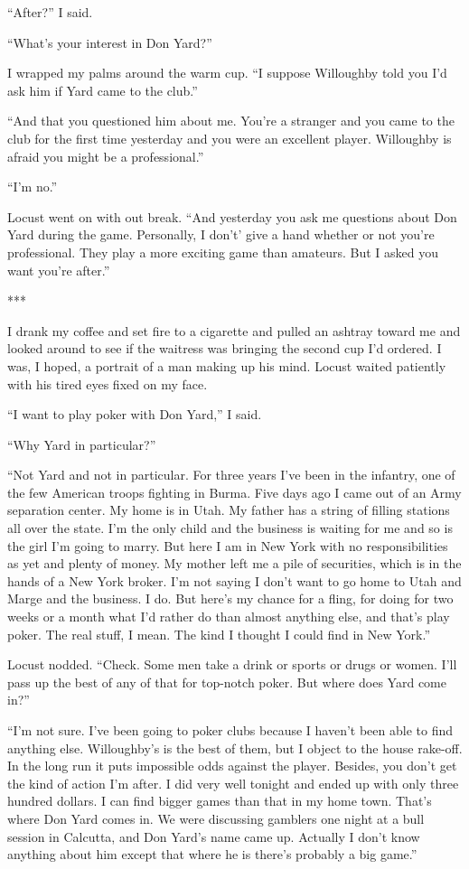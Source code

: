 \documentclass{novel}
\begin{document}
“After?” I said.

“What’s your interest in Don Yard?”

I wrapped my palms around the warm cup. “I suppose Willoughby told you I’d ask him if Yard came to the club.”

“And that you questioned him about me. You’re a stranger and you came to the club for the first time yesterday and you were an excellent player. Willoughby is afraid you might be a professional.”

“I’m no.”

Locust went on with out break. “And yesterday you ask me questions about Don Yard during the game. Personally, I don’t’ give a hand whether or not you’re professional. They play a more exciting game than amateurs. But I asked you want you’re after.”

***

I drank my coffee and set fire to a cigarette and pulled an ashtray toward me and looked around to see if the waitress was bringing the second cup I’d ordered. I was, I hoped, a portrait of a man making up his mind. Locust waited patiently with his tired eyes fixed on my face.

“I want to play poker with Don Yard,” I said.

“Why Yard in particular?”

“Not Yard and not in particular. For three years I’ve been in the infantry, one of the few American troops fighting in Burma. Five days ago I came out of an Army separation center. My home is in Utah. My father has a string of filling stations all over the state. I’m the only child and the business is waiting for me and so is the girl I’m going to marry. But here I am in New York with no responsibilities as yet and plenty of money. My mother left me a pile of securities, which is in the hands of a New York broker. I’m not saying I don’t want to go home to Utah and Marge and the business. I do. But here’s my chance for a fling, for doing for two weeks or a month what I’d rather do than almost anything else, and that’s play poker. The real stuff, I mean. The kind I thought I could find in New York.”

Locust nodded. “Check. Some men take a drink or sports or drugs or women. I’ll pass up the best of any of that for top-notch poker. But where does Yard come in?”

“I’m not sure. I’ve been going to poker clubs because I haven’t been able to find anything else. Willoughby’s is the best of them, but I object to the house rake-off. In the long run it puts impossible odds against the player. Besides, you don’t get the kind of action I’m after. I did very well tonight and ended up with only three hundred dollars. I can find bigger games than that in my home town. That’s where Don Yard comes in. We were discussing gamblers one night at a bull session in Calcutta, and Don Yard’s name came up. Actually I don’t know anything about him except that where he is there’s probably a big game.”
\end{document}
